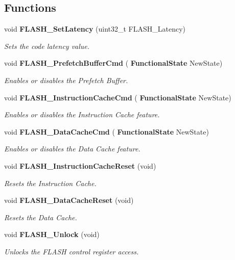 \subsection*{Functions}
\begin{DoxyCompactItemize}
\item 
void \textbf{ F\+L\+A\+S\+H\+\_\+\+Set\+Latency} (uint32\+\_\+t F\+L\+A\+S\+H\+\_\+\+Latency)
\begin{DoxyCompactList}\small\item\em Sets the code latency value. \end{DoxyCompactList}\item 
void \textbf{ F\+L\+A\+S\+H\+\_\+\+Prefetch\+Buffer\+Cmd} (\textbf{ Functional\+State} New\+State)
\begin{DoxyCompactList}\small\item\em Enables or disables the Prefetch Buffer. \end{DoxyCompactList}\item 
void \textbf{ F\+L\+A\+S\+H\+\_\+\+Instruction\+Cache\+Cmd} (\textbf{ Functional\+State} New\+State)
\begin{DoxyCompactList}\small\item\em Enables or disables the Instruction Cache feature. \end{DoxyCompactList}\item 
void \textbf{ F\+L\+A\+S\+H\+\_\+\+Data\+Cache\+Cmd} (\textbf{ Functional\+State} New\+State)
\begin{DoxyCompactList}\small\item\em Enables or disables the Data Cache feature. \end{DoxyCompactList}\item 
void \textbf{ F\+L\+A\+S\+H\+\_\+\+Instruction\+Cache\+Reset} (void)
\begin{DoxyCompactList}\small\item\em Resets the Instruction Cache. \end{DoxyCompactList}\item 
void \textbf{ F\+L\+A\+S\+H\+\_\+\+Data\+Cache\+Reset} (void)
\begin{DoxyCompactList}\small\item\em Resets the Data Cache. \end{DoxyCompactList}\item 
void \textbf{ F\+L\+A\+S\+H\+\_\+\+Unlock} (void)
\begin{DoxyCompactList}\small\item\em Unlocks the F\+L\+A\+SH control register access. \end{DoxyCompactList}\item 

\end{DoxyCompactItemize}

